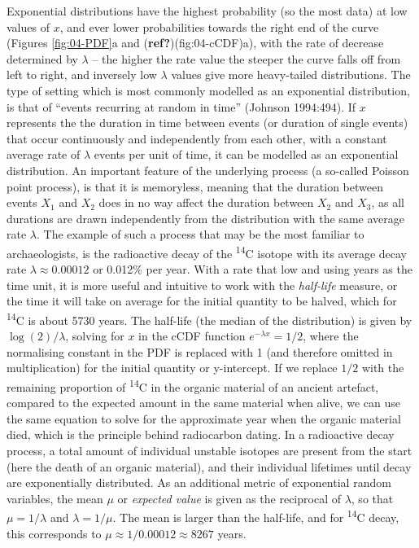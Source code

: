 \documentclass[
  12pt,
]{book}
\begin{document}
Exponential distributions have the highest probability (so the most data) at low values of \(x\), and ever lower probabilities towards the right end of the curve (Figures \ref{fig:04-PDF}a and (\textbf{ref?})(fig:04-cCDF)a), with the rate of decrease determined by \(\lambda\) -- the higher the rate value the steeper the curve falls off from left to right, and inversely low \(\lambda\) values give more heavy-tailed distributions. The type of setting which is most commonly modelled as an exponential distribution, is that of ``events recurring at random in time'' (Johnson 1994:494). If \(x\) represents the the duration in time between events (or duration of single events) that occur continuously and independently from each other, with a constant average rate of \(\lambda\) events per unit of time, it can be modelled as an exponential distribution. An important feature of the underlying process (a so-called Poisson point process), is that it is memoryless, meaning that the duration between events \(X_1\) and \(X_2\) does in no way affect the duration between \(X_2\) and \(X_3\), as all durations are drawn independently from the distribution with the same average rate \(\lambda\). The example of such a process that may be the most familiar to archaeologists, is the radioactive decay of the \textsuperscript{14}C isotope with its average decay rate \(\lambda \approx 0.00012\) or 0.012\% per year. With a rate that low and using years as the time unit, it is more useful and intuitive to work with the \emph{half-life} measure, or the time it will take on average for the initial quantity to be halved, which for \textsuperscript{14}C is about 5730 years. The half-life (the median of the distribution) is given by \(\log (2)/\lambda\), solving for \(x\) in the cCDF function \(e^{-\lambda x} = 1/2\), where the normalising constant in the PDF is replaced with 1 (and therefore omitted in multiplication) for the initial quantity or y-intercept. If we replace \(1/2\) with the remaining proportion of \textsuperscript{14}C in the organic material of an ancient artefact, compared to the expected amount in the same material when alive, we can use the same equation to solve for the approximate year when the organic material died, which is the principle behind radiocarbon dating. In a radioactive decay process, a total amount of individual unstable isotopes are present from the start (here the death of an organic material), and their individual lifetimes until decay are exponentially distributed. As an additional metric of exponential random variables, the mean \(\mu\) or \emph{expected value} is given as the reciprocal of \(\lambda\), so that \(\mu = 1/\lambda\) and \(\lambda = 1/\mu\). The mean is larger than the half-life, and for \textsuperscript{14}C decay, this corresponds to \(\mu \approx 1/0.00012 \approx 8267\) years.
\end{document}
